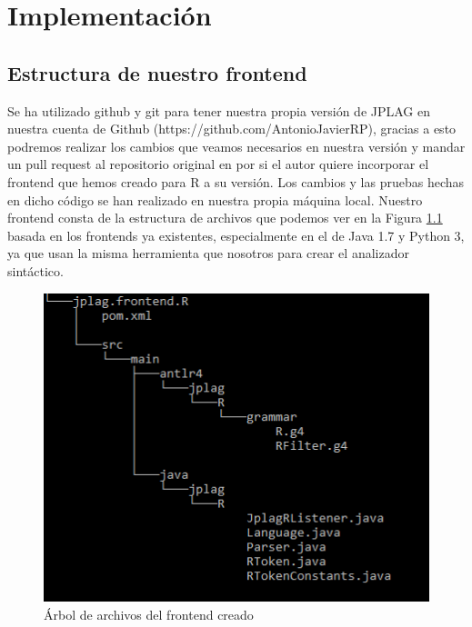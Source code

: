 \chapter{Implementación}

\section{Estructura de nuestro frontend}
Se ha utilizado github y git para tener nuestra propia versión de JPLAG en nuestra cuenta de Github (https://github.com/AntonioJavierRP), gracias a esto podremos realizar los cambios que veamos necesarios en nuestra versión y mandar un pull request al repositorio original en \cite{jplag_github} por si el autor quiere incorporar el frontend que hemos creado para R a su versión.
\newline
Los cambios y las pruebas hechas en dicho código se han realizado en nuestra propia máquina local.
\newline
Nuestro frontend consta de la estructura de archivos que podemos ver en la Figura \ref{fig:ej_frontend} basada en los frontends ya existentes, especialmente en el de Java 1.7 y Python 3, ya que usan la misma herramienta que nosotros para crear el analizador sintáctico.

\begin{figure}[H] %
\centering
\includegraphics[scale=1]{imagenes/estructura_frontend.png}  %
\caption{Árbol de archivos del frontend creado} \label{fig:ej_frontend}
\end{figure}


